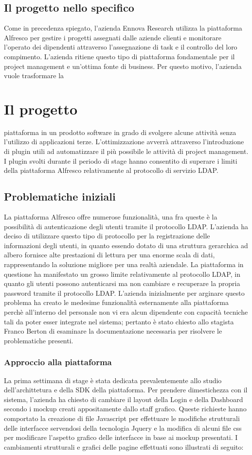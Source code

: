 \subsection{Il progetto nello specifico}
Come in precedenza spiegato, l’azienda Ennova Research utilizza la piattaforma Alfresco
per gestire i progetti assegnati dalle aziende clienti e monitorare l’operato dei dipendenti
attraverso l’assegnazione di task e il controllo del loro compimento.
L’azienda ritiene questo tipo di piattaforma fondamentale per il project management
e un’ottima fonte di business. Per questo motivo, l’azienda vuole trasformare la
\section{Il progetto}
piattaforma in un prodotto software in grado di svolgere alcune attività senza l’utilizzo
di applicazioni terze. L’ottimizzazione avverrà attraverso l’introduzione di plugin utili
ad automatizzare il più possibile le attività di project management. I plugin svolti
durante il periodo di stage hanno consentito di superare i limiti della piattaforma
Alfresco relativamente al protocollo di servizio LDAP.
\subsection{Problematiche iniziali}
La piattaforma Alfresco offre numerose funzionalità, una fra queste è la possibilità di
autenticazione degli utenti tramite il protocollo LDAP.
L’azienda ha deciso di utilizzare questo tipo di protocollo per la registrazione delle
informazioni degli utenti, in quanto essendo dotato di una struttura gerarchica ad
albero fornisce alte prestazioni di lettura per una enorme scala di dati, rappresentando
la soluzione migliore per una realtà aziendale.
La piattaforma in questione ha manifestato un grosso limite relativamente al protocollo
LDAP, in quanto gli utenti possono autenticarsi ma non cambiare e recuperare la
propria password tramite il protocollo LDAP.
L’azienda inizialmente per arginare questo problema ha creato le medesime funzionalità
esternamente alla piattaforma perchè all’interno del personale non vi era alcun
dipendente con capacità tecniche tali da poter esser integrate nel sistema; pertanto è
stato chiesto allo stagista Franco Berton di esaminare la documentazione necessaria
per risolvere le problematiche presenti.
\subsubsection{Approccio alla piattaforma}
La prima settimana di stage è stata dedicata prevalentemente allo studio dell’archittetura
e della SDK della piattaforma. Per prendere dimestichezza con il sistema, l’azienda
ha chiesto di cambiare il layout della Login e della Dashboard secondo i mockup creati
appositamente dallo staff grafico.
Queste richieste hanno comportato la creazione di file Javascript per effettuare le
modifiche strutturali delle interfacce servendosi della tecnologia Jquery e la modifica
di alcuni file css per modificare l’aspetto grafico delle interfacce in base ai mockup
presentati.
I cambiamenti strutturali e grafici delle pagine effettuati sono illustrati di seguito:
